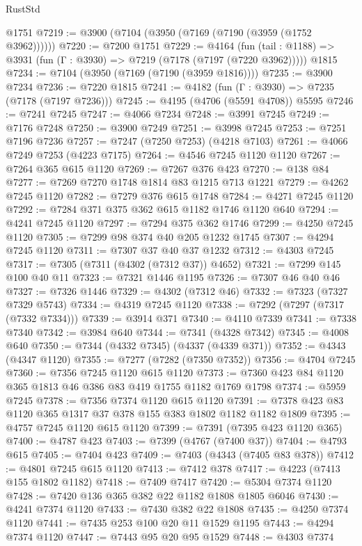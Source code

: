 \begin{lexlean}{RustStd}
\begin{coremodule}
    @1751
@7219 := @3900 (@7104 (@3950 (@7169 (@7190 (@3959 (@1752 @3962))))))
@7220 := @7200 @1751
@7229 := @4164
    (fun (tail : @1188) => @3931 (fun (Γ : @3930) => @7219 (@7178 (@7197 (@7220 @3962)))))
    @1815
@7234 := @7104 (@3950 (@7169 (@7190 (@3959 @1816))))
@7235 := @3900 @7234
@7236 := @7220 @1815
@7241 := @4182 (fun (Γ : @3930) => @7235 (@7178 (@7197 @7236)))
@7245 := @4195 (@4706 (@5591 @4708)) @5595
@7246 := @7241 @7245
@7247 := @4066 @7234
@7248 := @3991 @7245
@7249 := @7176 @7248
@7250 := @3900 @7249
@7251 := @3998 @7245
@7253 := @7251 @7196 @7236
@7257 := @7247 (@7250 @7253) (@4218 @7103)
@7261 := @4066 @7249 @7253 (@4223 @7175)
@7264 := @4546 @7245 @1120 @1120
@7267 := @7264 @365 @615 @1120
@7269 := @7267 @376 @423
@7270 := @138 @84
@7277 := @7269 @7270 @1748 @1814 @83 @1215 @713 @1221
@7279 := @4262 @7245 @1120
@7282 := @7279 @376 @615 @1748
@7284 := @4271 @7245 @1120
@7292 := @7284 @371 @375 @362 @615 @1182 @1746 @1120 @640
@7294 := @4241 @7245 @1120
@7297 := @7294 @375 @362 @1746
@7299 := @4250 @7245 @1120
@7305 := @7299 @98 @374 @40 @205 @1232 @1745
@7307 := @4294 @7245 @1120
@7311 := @7307 @37 @40 @37 @1232
@7312 := @4303 @7245
@7317 := @7305 (@7311 (@4302 (@7312 @37)) @4652)
@7321 := @7299 @145 @100 @40 @11
@7323 := @7321 @1446 @1195
@7326 := @7307 @46 @40 @46
@7327 := @7326 @1446
@7329 := @4302 (@7312 @46)
@7332 := @7323 (@7327 @7329 @5743)
@7334 := @4319 @7245 @1120
@7338 := @7292 (@7297 (@7317 (@7332 @7334)))
@7339 := @3914 @371
@7340 := @4110 @7339
@7341 := @7338 @7340
@7342 := @3984 @640
@7344 := @7341 (@4328 @7342)
@7345 := @4008 @640
@7350 := @7344 (@4332 @7345) (@4337 (@4339 @371))
@7352 := @4343 (@4347 @1120)
@7355 := @7277 (@7282 (@7350 @7352))
@7356 := @4704 @7245
@7360 := @7356 @7245 @1120 @615 @1120
@7373 := @7360 @423 @84 @1120 @365 @1813 @46 @386 @83 @419 @1755 @1182 @1769 @1798
@7374 := @5959 @7245
@7378 := @7356 @7374 @1120 @615 @1120
@7391 := @7378 @423 @83 @1120 @365 @1317 @37 @378 @155 @383 @1802 @1182 @1182 @1809
@7395 := @4757 @7245 @1120 @615 @1120
@7399 := @7391 (@7395 @423 @1120 @365)
@7400 := @4787 @423
@7403 := @7399 (@4767 (@7400 @37))
@7404 := @4793 @615
@7405 := @7404 @423
@7409 := @7403 (@4343 (@7405 @83 @378))
@7412 := @4801 @7245 @615 @1120
@7413 := @7412 @378
@7417 := @4223 (@7413 @155 @1802 @1182)
@7418 := @7409 @7417
@7420 := @5304 @7374 @1120
@7428 := @7420 @136 @365 @382 @22 @1182 @1808 @1805 @6046
@7430 := @4241 @7374 @1120
@7433 := @7430 @382 @22 @1808
@7435 := @4250 @7374 @1120
@7441 := @7435 @253 @100 @20 @11 @1529 @1195
@7443 := @4294 @7374 @1120
@7447 := @7443 @95 @20 @95 @1529
@7448 := @4303 @7374

\end{coremodule}
\end{lexlean}
